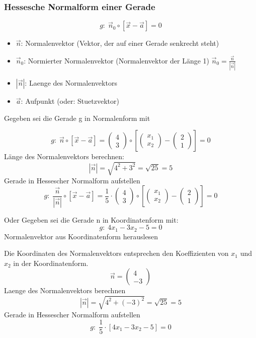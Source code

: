 \begin{multicols*}{2}
    \subsubsection{Hessesche Normalform einer Gerade}
    \[g\colon\; \vec{n}_0 \circ [\vec{x} - \vec{a}] = 0\]
    \begin{itemize}
        \item  $\vec{n}$: Normalenvektor (Vektor, der auf einer Gerade senkrecht steht)
        \item  $\vec{n}_0$: Normierter Normalenvektor (Normalenvektor der Länge 1) $\vec{n}_0 = \frac{\vec{n}}{|\vec{n}|}$
        \item  $|\vec{n}|$: Laenge des Normalenvektors
        \item  $\vec{a}$: Aufpunkt (oder: Stuetzvektor)
    \end{itemize}

    Gegeben sei die Gerade g in Normalenform mit

    \[g\colon\; \vec{n} \circ \left[\vec{x} - \vec{a}\right] = \begin{pmatrix} 4 \\ 3 \end{pmatrix} \circ \left[\begin{pmatrix} x_1 \\ x_2 \end{pmatrix} - \begin{pmatrix} 2 \\ 1 \end{pmatrix}\right] = 0\]
    Länge des Normalenvektors berechnen:
    \[ |\vec{n}| = \sqrt{4^2 + 3^2} = \sqrt{25} = 5\]
    Gerade in Hessescher Normalform aufstellen
    \[g\colon\; \frac{\vec{n}}{|\vec{n}|} \circ \left[\vec{x} - \vec{a}\right] = \frac{1}{5} \cdot \begin{pmatrix} 4 \\ 3 \end{pmatrix} \circ \left[\begin{pmatrix} x_1 \\ x_2 \end{pmatrix} - \begin{pmatrix} 2 \\ 1 \end{pmatrix}\right] = 0\]

    Oder Gegeben sei die Gerade n in Koordinatenform mit:
    \[g\colon\; 4x_1 - 3x_2 - 5 = 0\]
    Normalenvektor aus Koordinatenform herauslesen

    Die Koordinaten des Normalenvektors entsprechen den Koeffizienten von $x_1$ und $x_2$ in der Koordinatenform.
    \[\vec{n} = \begin{pmatrix} 4 \\ -3 \end{pmatrix}\]
    Laenge des Normalenvektors berechnen
    \[|\vec{n}| = \sqrt{4^2 + (-3)^2} = \sqrt{25} = 5\]
    Gerade in Hessescher Normalform aufstellen
    \[g\colon\; \frac{1}{5} \cdot [4x_1 - 3x_2 - 5] = 0\]


\end{multicols*}
